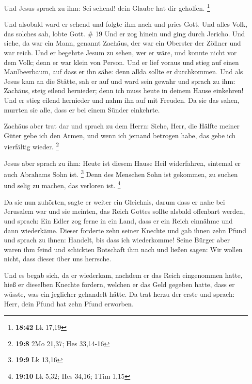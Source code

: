  Und Jesus sprach zu ihm: Sei sehend! dein Glaube hat dir
geholfen. \footnote{\textbf{18:42} Lk 17,19}

 Und alsobald ward er sehend und folgte ihm nach und pries
Gott. Und alles Volk, das solches sah, lobte Gott. \# 19 
Und er zog hinein und ging durch Jericho.  Und siehe, da war
ein Mann, genannt Zachäus, der war ein Oberster der Zöllner und war
reich.  Und er begehrte Jesum zu sehen, wer er wäre, und
konnte nicht vor dem Volk; denn er war klein von Person. 
Und er lief voraus und stieg auf einen Maulbeerbaum, auf dass er ihn
sähe: denn allda sollte er durchkommen.  Und als Jesus kam
an die Stätte, sah er auf und ward sein gewahr und sprach zu ihm:
Zachäus, steig eilend hernieder; denn ich muss heute in deinem Hause
einkehren!  Und er stieg eilend hernieder und nahm ihn auf
mit Freuden.  Da sie das sahen, murrten sie alle, dass er
bei einem Sünder einkehrte.

 Zachäus aber trat dar und sprach zu dem Herrn: Siehe, Herr,
die Hälfte meiner Güter gebe ich den Armen, und wenn ich jemand betrogen
habe, das gebe ich vierfältig wieder. \footnote{\textbf{19:8} 2Mo 21,37;
  Hes 33,14-16}

 Jesus aber sprach zu ihm: Heute ist diesem Hause Heil
widerfahren, sintemal er auch Abrahams Sohn ist. \footnote{\textbf{19:9}
  Lk 13,16}  Denn des Menschen Sohn ist gekommen, zu suchen
und selig zu machen, das verloren ist. \footnote{\textbf{19:10} Lk 5,32;
  Hes 34,16; 1Tim 1,15}

 Da sie nun zuhörten, sagte er weiter ein Gleichnis, darum
dass er nahe bei Jerusalem war und sie meinten, das Reich Gottes sollte
alsbald offenbart werden,  und sprach: Ein Edler zog ferne
in ein Land, dass er ein Reich einnähme und dann wiederkäme.
 Dieser forderte zehn seiner Knechte und gab ihnen zehn
Pfund und sprach zu ihnen: Handelt, bis dass ich wiederkomme!
 Seine Bürger aber waren ihm feind und schickten Botschaft
ihm nach und ließen sagen: Wir wollen nicht, dass dieser über uns
herrsche.

 Und es begab sich, da er wiederkam, nachdem er das Reich
eingenommen hatte, hieß er dieselben Knechte fordern, welchen er das
Geld gegeben hatte, dass er wüsste, was ein jeglicher gehandelt hätte.
 Da trat herzu der erste und sprach: Herr, dein Pfund hat
zehn Pfund erworben.

